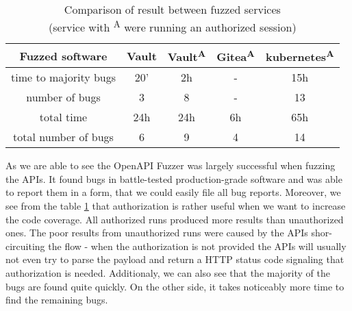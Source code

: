 \paragraph{}
\begin{table}[h]
\begin{center}
\begin{tabular}{|c|c c c c|}
\hline
Fuzzed software & Vault & Vault\textsuperscript{A} & Gitea\textsuperscript{A} & kubernetes\textsuperscript{A} \\
\hline
time to majority bugs & 20' & 2h  & -  & 15h \\
number of bugs        & 3   & 8   & -  & 13  \\
\hline
total time            & 24h & 24h & 6h & 65h \\
total number of bugs  & 6   & 9   & 4  & 14  \\
\hline
\end{tabular}
\caption[Comparison of the result between fuzzed services]{Comparison of result between fuzzed services\\(service with \textsuperscript{A} were running an authorized session)}
\label{table:fuzzed-software}
\end{center}
\end{table}

As we are able to see the OpenAPI Fuzzer was largely successful when fuzzing the APIs. It found bugs in battle-tested production-grade software and was able to report them in a form, that we could easily file all bug reports. Moreover, we see from the table \ref{table:fuzzed-software} that authorization is rather useful when we want to increase the code coverage. All authorized runs produced more results than unauthorized ones. The poor results from unauthorized runs were caused by the APIs shor-circuiting the flow - when the authorization is not provided the APIs will usually not even try to parse the payload and return a HTTP status code signaling that authorization is needed. Additionaly, we can also see that the majority of the bugs are found quite quickly. On the other side, it takes noticeably more time to find the remaining bugs.
